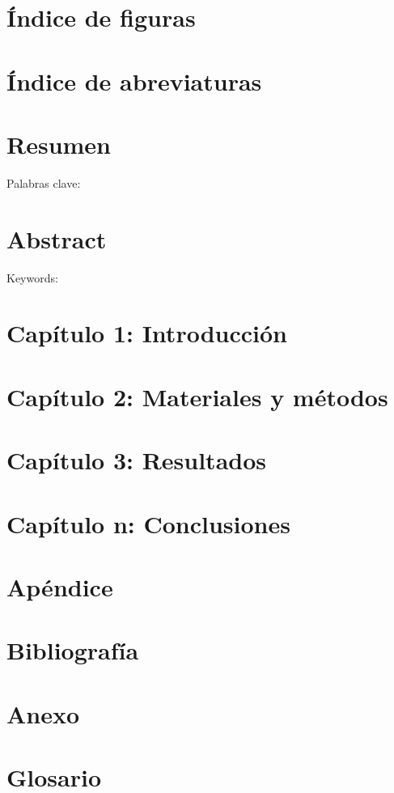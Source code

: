 \documentclass{article}
\begin{document}
\newpage
\section{\'Indice de figuras}

\newpage
\section{\'Indice de abreviaturas}

\newpage
\section{Resumen}

Palabras clave:

\newpage
\section{Abstract}

Keywords: 

\newpage
\section{Cap\'itulo 1: Introducci\'on}

\newpage
\section{Cap\'itulo 2: Materiales y m\'etodos}

\newpage
\section{Cap\'itulo 3: Resultados}

\newpage
\section{Cap\'itulo n: Conclusiones}

\newpage
\section{Ap\'endice}

\newpage
\section{Bibliograf\'ia}

\newpage
\section{Anexo}

\newpage
\section{Glosario}
\end{document}
